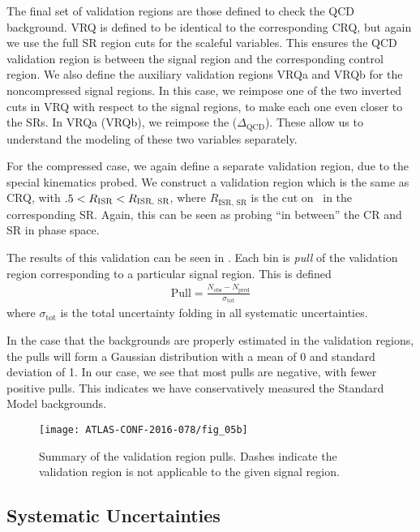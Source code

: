 The final set of validation regions are those defined to check the QCD background.
VRQ is defined to be identical to the corresponding CRQ, but again we use the full SR region cuts for the scaleful variables.
This ensures the QCD validation region is between the signal region and the corresponding control region.
We also define the auxiliary validation regions VRQa and VRQb for the noncompressed signal regions.
In this case, we reimpose one of the two inverted cuts in VRQ with respect to the signal regions, to make each one even closer to the SRs.
In VRQa (VRQb), we reimpose the  ($\Delta_{\mathrm{QCD}}$).
These allow us to understand the modeling of these two variables separately.

For the compressed case, we again define a separate validation region, due to the special kinematics probed.
We construct a validation region which is the same as CRQ, with $.5 < R_{\text{ISR}} < R_{\text{ISR, SR}}$, where $R_{\text{ISR, SR}}$ is the cut on \risr~in the corresponding SR.
Again, this can be seen as probing ``in between'' the CR and SR in phase space.

The results of this validation can be seen in .
Each bin is \textit{pull} of the validation region corresponding to a particular signal region.
This is defined
\begin{align}
\text{Pull} = \frac{N_{\mathrm{obs}} - N_{\mathrm{pred}}}{\sigma_{\mathrm{tot}}}
\end{align}
where $\sigma_{\mathrm{tot}}$ is the total uncertainty folding in all systematic uncertainties.

In the case that the backgrounds are properly estimated in the validation regions, the pulls will form a Gaussian distribution with a mean of 0 and standard deviation of 1.
In our case, we see that most pulls are negative, with fewer positive pulls.
This indicates we have conservatively measured the Standard Model backgrounds.

\begin{figure}[tbp]
\caption{Summary of the validation region pulls.
Dashes indicate the validation region is not applicable to the given signal region.} \label{fig:vr_summary}
\texttt{[image: ATLAS-CONF-2016-078/fig\_05b]}
\end{figure}

\subsection{Systematic Uncertainties}


